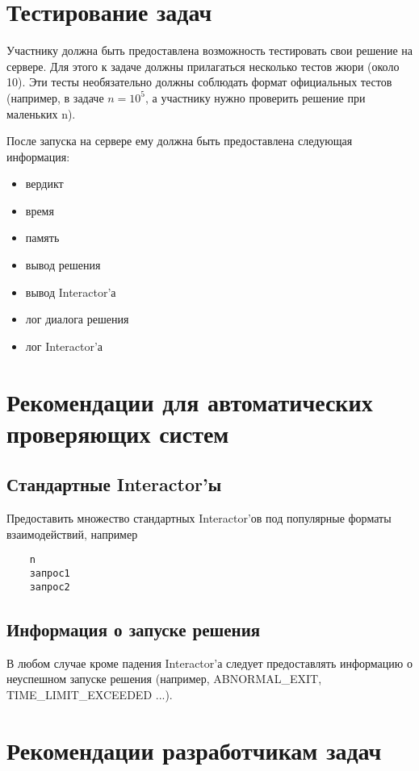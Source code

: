 \section{Тестирование задач}
Участнику должна быть предоставлена возможность тестировать свои решение на сервере.
Для этого к задаче должны прилагаться несколько тестов жюри (около 10).
Эти тесты необязательно должны соблюдать формат официальных тестов
(например, в задаче $n = 10^5$, а участнику нужно проверить решение при маленьких n).

После запуска на сервере ему должна быть предоставлена следующая информация:
\begin{itemize}
    \item вердикт
    \item время
    \item память
    \item вывод решения
    \item вывод Interactor'а
    \item лог диалога решения
    \item лог Interactor'а
\end{itemize}

\pagebreak

\section{Рекомендации для автоматических проверяющих систем}
\subsection{Стандартные Interactor'ы}
Предоставить множество стандартных Interactor'ов под популярные форматы взаимодействий,
например
\begin{verbatim}
    n
    запрос1
    запрос2
\end{verbatim}

\subsection{Информация о запуске решения}
В любом случае кроме падения Interactor'а следует предоставлять информацию
о неуспешном запуске решения (например, ABNORMAL\_EXIT, TIME\_LIMIT\_EXCEEDED ...).

\pagebreak

\section{Рекомендации разработчикам задач}

